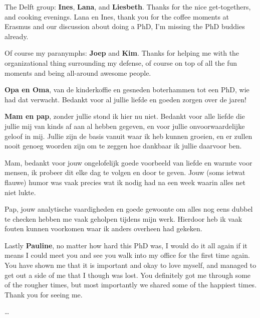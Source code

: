 The Delft group: \textbf{Ines}, \textbf{Lana}, and \textbf{Liesbeth}.
Thanks for the nice get-togethers, and cooking evenings.
Lana en Ines, thank you for the coffee moments at Erasmus and our discussion about doing a PhD, I'm missing the PhD buddies already.

Of course my paranymphs: \textbf{Joep} and \textbf{Kim}.
Thanks for helping me with the organizational thing surrounding my defense, of course on top of all the fun moments and being all-around awesome people.

\textbf{Opa en Oma}, van de kinderkoffie en gesneden boterhammen tot een PhD, wie had dat verwacht.
Bedankt voor al jullie liefde en goeden zorgen over de jaren!

\textbf{Mam en pap}, zonder jullie stond ik hier nu niet.
Bedankt voor alle liefde die jullie mij van kinds af aan al hebben gegeven, en voor jullie onvoorwaardelijke geloof in mij.
Jullie zijn de basis vanuit waar ik heb kunnen groeien, en er zullen nooit genoeg woorden zijn om te zeggen hoe dankbaar ik jullie daarvoor ben.

Mam, bedankt voor jouw ongelofelijk goede voorbeeld van liefde en warmte voor mensen, ik probeer dit elke dag te volgen en door te geven.
Jouw (soms ietwat flauwe) humor was vaak precies wat ik nodig had na een week waarin alles net niet lukte.

Pap, jouw analytische vaardigheden en goede gewoonte om alles nog eens dubbel te checken hebben me vaak geholpen tijdens mijn werk.
Hierdoor heb ik vaak fouten kunnen voorkomen waar ik anders overheen had gekeken.

Lastly \textbf{Pauline}, no matter how hard this PhD was, I would do it all again if it means I could meet you and see you walk into my office for the first time again.
You have shown me that it is important and okay to love myself, and managed to get out a side of me that I though was lost.
You definitely got me through some of the rougher times, but most importantly we shared some of the happiest times.
Thank you for seeing me.


\dots
